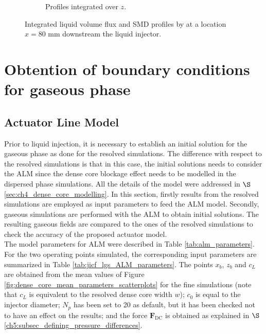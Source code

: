 \begin{figure}[h!]
\begin{subfigure}[b]{0.45\textwidth}
   \caption{Profiles integrated over $z$.}
  \label{fig:integrated_results_Becker_expe_results_over_z}
\end{subfigure}
\caption[{Integrated liquid volume flux and SMD profiles by  at a location $x = 80$ mm downstream the liquid injector.}]{Integrated liquid volume flux and SMD profiles by  at a location $x = 80$ mm downstream the liquid injector. }
\label{fig:integrated_results_Becker_expe_results}
\end{figure}

\section{Obtention of boundary conditions for gaseous phase}

\subsection{Actuator Line Model}

Prior to liquid injection, it is necessary to establish an initial solution for the gaseous phase as done for the resolved simulations. The difference with respect to the resolved simulations is that in this case, the initial solutions needs to consider the ALM since the dense core blockage effect needs to be modelled in the dispersed phase simulations. All the details of the model were addressed in $\S$\ref{sec:ch4_dense_core_modelling}. In this section, firstly results from the resolved simulations are employed as input parameters to feed the ALM model. Secondly, gaseous simulations are performed with the ALM to obtain initial solutions. The resulting gaseous fields are compared to the ones of the resolved simulations to check the accuracy of the proposed actuator model. \\


The model parameters for ALM were described in Table \ref{tab:alm_parameters}. For the two operating points simulated, the corresponding input parameters are summarized in Table \ref{tab:jicf_lgs_ALM_parameters}. The points $x_b$, $z_b$ and $c_L$ are obtained from the mean values of Figure \ref{fig:dense_core_mean_parameters_scatterplots} for the fine simulations (note that $c_L$ is equivalent to the resolved dense core width $w$); $c_0$ is equal to the injector diameter; $N_p$ has been set to 20 as default, but it has been checked not to have an effect on the results; and the force $\textbf{F}_\mathrm{DC}$ is obtained as explained in $\S$\ref{ch5:subsec_defining_pressure_differences}.

